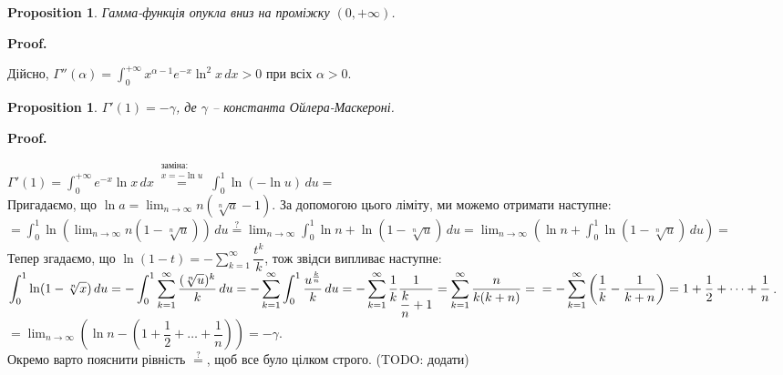 \documentclass[a4paper, 10pt]{article}
\makeatletter
\def\qed{$\blacksquare$}
\theoremstyle{theoremdd}
\theoremstyle{theoremdd}
\theoremstyle{theoremdd}
\theoremstyle{theoremdd}
\theoremstyle{theoremdd}
\theoremstyle{theoremdd}
\newtheorem{proposition}[theorem]{Proposition}
\theoremstyle{theoremdd}
\theoremstyle{theoremdd}
\theoremstyle{theoremdd}
\renewenvironment{proof}[1][Proof.\\]{\par
\pushQED{\hfill \qed}%
\normalfont \topsep6\p@\@plus6\p@\relax
\trivlist
\item\relax
{\bfseries
#1\@addpunct{.}}\hspace\labelsep\ignorespaces
}{%
\popQED\endtrivlist\@endpefalse
}
\makeatother
\begin{document}
\begin{proposition}
Гамма-функція опукла вниз на проміжку $(0,+\infty)$.
\end{proposition}

\begin{proof}
Дійсно, $\Gamma''(\alpha) = \displaystyle\int_0^{+\infty} x^{\alpha-1} e^{-x} \ln^2 x\,dx > 0$ при всіх $\alpha > 0$.
\end{proof}

\begin{proposition}
$\Gamma'(1) = -\gamma$, де $\gamma$ -- константа Ойлера-Маскероні.
\end{proposition}

\begin{proof}
$\Gamma'(1) = \displaystyle\int_0^{+\infty} e^{-x} \ln x\,dx \overset{\substack{\text{заміна:} \\ x = -\ln u}}{=} \int_0^1 \ln (-\ln u)\,du \boxed{=}$\\
Пригадаємо, що $\ln a = \displaystyle\lim_{n \to \infty} n (\sqrt[n]{a}-1)$. За допомогою цього ліміту, ми можемо отримати наступне:\\
$\boxed{=} \displaystyle \int_0^1 \ln \left( \lim_{n \to \infty} n(1-\sqrt[n]{u})\right)\,du \overset{?}{=} \lim_{n \to \infty} \int_0^1 \ln n + \ln(1-\sqrt[n]{u})\,du = \lim_{n \to \infty} \left( \ln n + \int_0^1 \ln(1-\sqrt[n]{u})\,du \right) \boxed{=}$\\
Тепер згадаємо, що $\ln(1-t) = -\displaystyle\sum_{k=1}^\infty \dfrac{t^k}{k}$, тож звідси випливає наступне:\\
$\displaystyle\int_0^1 \ln (1-\sqrt[n]{x})\,du = -\int_0^1 \sum_{k=1}^\infty \dfrac{(\sqrt[n]{u})^k}{k}\,du = -\sum_{k=1}^\infty \int_0^1 \dfrac{u^{\frac{k}{n}}}{k}\,du = -\sum_{k=1}^\infty \dfrac{1}{k} \dfrac{1}{\dfrac{k}{n}+1} = \sum_{k=1}^\infty \dfrac{n}{k(k+n)} = \\ = -\sum_{k=1}^\infty \left( \dfrac{1}{k} - \dfrac{1}{k+n} \right) = 1 + \dfrac{1}{2} + \dots + \dfrac{1}{n}$.\\
$\boxed{=} \displaystyle\lim_{n \to \infty} \left( \ln n - \left( 1 + \dfrac{1}{2} + \dots + \dfrac{1}{n} \right) \right) = -\gamma$.
\bigskip \\
Окремо варто пояснити рівність $\overset{?}{=}$, щоб все було цілком строго. (TODO: додати)
\iffalse
$\displaystyle\int_0^{1-\varepsilon} \ln(-\ln u)\,du = \lim_{n \to \infty}\int_0^{1-\varepsilon} \ln n + \ln(1-\sqrt[n]{u})\,du$ для кожного $\varepsilon > 0$ виконується, оскільки функціональна послідовність $f_n(u) = \ln n + \ln(1-\sqrt[n]{u})$ прямує рівномірним чином до $f(u) = \ln(-\ln u))$ на $[0,1-\varepsilon]$ за ознакою Діні. Тепер розглянемо функціональну послідовність $g_n(\varepsilon) = \displaystyle\int_0^{1-\varepsilon} \ln n + \ln(1-\sqrt[n]{u})\,du$. Вона вже прямує до $g(\varepsilon) = \displaystyle\int_0^{1-\varepsilon} \ln(-\ln u)\,du$
\fi
\end{proof}
\end{document}
